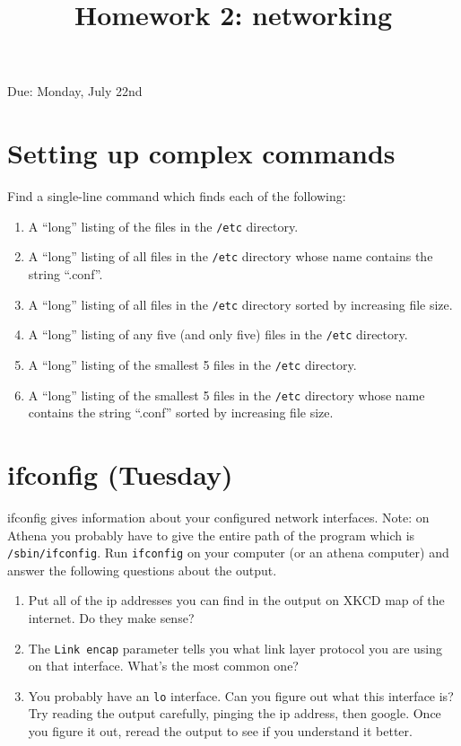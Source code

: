 \documentclass{article}
\title{Homework 2:  networking}
\begin{document}
\maketitle

Due:  Monday, July 22nd

\section{Setting up complex commands}
Find a single-line command which finds each of the following:
\begin{enumerate}[a]

\item A ``long'' listing of the files in the \texttt{/etc} directory.
\item A ``long'' listing of all files in the \texttt{/etc} directory whose name contains the string ``.conf''.
\item A ``long'' listing of all files in the \texttt{/etc} directory sorted by increasing file size.
\item A ``long'' listing of any five (and only five) files in the \texttt{/etc} directory.
\item A ``long'' listing of the smallest 5 files in the \texttt{/etc} directory.
\item A ``long'' listing of the smallest 5 files in the \texttt{/etc} directory whose name contains the string ``.conf'' sorted by increasing file size.

\end{enumerate}

\section{ifconfig (Tuesday)}
ifconfig gives information about your configured network interfaces.  Note:  on Athena you probably have to give the entire path of the program which is \texttt{/sbin/ifconfig}.  Run \texttt{ifconfig} on your computer (or an athena computer) and answer the following questions about the output.

\begin{enumerate}[a]
\item Put all of the ip addresses you can find in the output on XKCD map of the internet.  Do they make sense?
\item The \texttt{Link encap} parameter tells you what link layer protocol you are using on that interface.  What's the most common one?
\item You probably have an \texttt{lo} interface.  Can you figure out what this interface is?  Try reading the output carefully, pinging the ip address, then google.  Once you figure it out, reread the output to see if you understand it better.
\end{enumerate}
\end{document}
